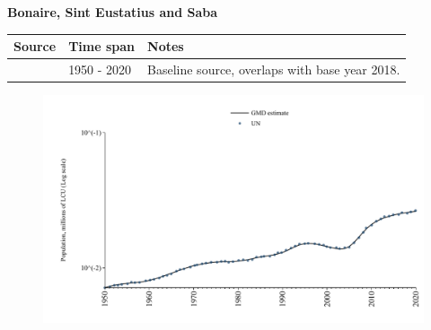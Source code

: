 \documentclass[12pt,a4paper,landscape]{article}
\begin{document}
\begin{adjustbox}{max totalsize={\paperwidth}{\paperheight},center}
\begin{minipage}[t][\textheight][t]{\textwidth}
\vspace*{0.5cm}
{}
\begin{center}
{\Large\bfseries Bonaire, Sint Eustatius and Saba}
\end{center}
\vspace{0.5cm}
\begin{table}[H]
\centering
\small
\begin{tabular}{|l|l|l|}
\hline
\textbf{Source} & \textbf{Time span} & \textbf{Notes} \\
\hline
\rowcolor{white}\cite{UN}& 1950 - 2020 &Baseline source, overlaps with base year 2018.\\
\hline
\end{tabular}
\end{table}
\begin{figure}[H]
\centering
\includegraphics[width=\textwidth,height=0.6\textheight,keepaspectratio]{graphs/BES_pop.pdf}
\end{figure}
\end{minipage}
\end{adjustbox}
\end{document}
